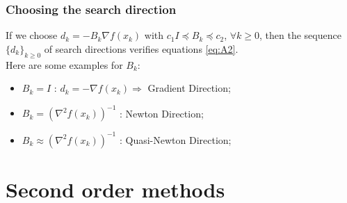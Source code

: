 \documentclass[12pt, openany]{report}
\theoremstyle{definition}
\begin{document}
\subsection{Choosing the search direction}
If we choose $d_k=-B_k \nabla f(x_k)$ with $c_1I \preceq B_k\preceq c_2$, $\forall k\ge 0$, then the sequence $\{d_k\}_{k\ge 0}$ of search directions verifies equations \eqref{eq:A2}.\\
Here are some examples for $B_k$:
\begin{itemize}
    \item $B_k=I$ : $d_k =-\nabla f(x_k)\Longrightarrow$ Gradient Direction;
    \item $B_k = (\nabla^2f(x_k))^{-1}$ : Newton Direction;
    \item $B_k \approx (\nabla^2f(x_k))^{-1}$ : Quasi-Newton Direction;
\end{itemize}
\chapter{Second order methods}
\end{document}
